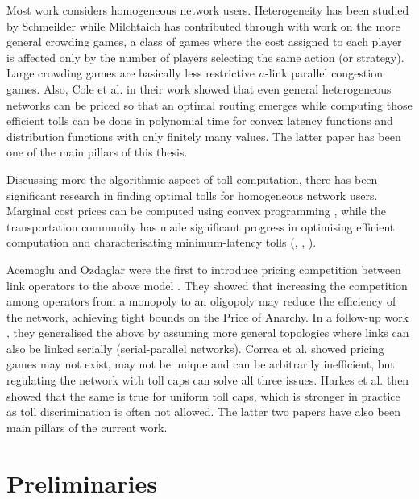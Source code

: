 \documentclass[10pt,a4paper]{book}
\theoremstyle{definition}
\theoremstyle{comment}
\begin{document}
Most work considers homogeneous network users.
Heterogeneity has been studied by Schmeilder \cite{1973JSP.....7..295S} while Milchtaich \cite[Prop $3.3$]{doi:10.1287/moor.25.3.349.12220} has contributed through with work on the more general crowding games, a class of games where the cost assigned to each player is affected only by the number of players selecting the same action (or strategy).
Large crowding games are basically less restrictive $n$-link parallel congestion games.
Also, Cole et al. \cite{10.1145/780542.780618} in their work showed that even general heterogeneous networks can be priced so that an optimal routing emerges while computing those efficient tolls can be done in polynomial time for convex latency functions and distribution functions with only finitely many values.
The latter paper has been one of the main pillars of this thesis.

Discussing more the algorithmic aspect of toll computation, there has been significant research in finding optimal tolls for homogeneous network users.
Marginal cost prices can be computed using convex programming \cite{beckmann1956studies}, while the transportation community has made significant progress in optimising efficient computation and characterisating minimum-latency tolls (\cite{10.1007/978-3-642-59179-2_4}, \cite{Hearn1998}, \cite{Hearn2002}).

Acemoglu and Ozdaglar were the first to introduce pricing competition between link operators to the above model \cite{10.1287/moor.1060.0231}.
They showed that increasing the competition among operators from a monopoly to an oligopoly may reduce the efficiency of the network, achieving tight bounds on the Price of Anarchy.
In a follow-up work \cite{10.1109/JSAC.2007.070812}, they generalised the above by assuming more general topologies where links can also be linked serially (serial-parallel networks).
Correa et al. \cite{correa2018pricing} showed pricing games may not exist, may not be unique and can be arbitrarily inefficient, but regulating the network with toll caps can solve all three issues.
Harkes et al. \cite{Harks_2019} then showed that the same is true for uniform toll caps, which is stronger in practice as toll discrimination is often not allowed.
The latter two papers have also been main pillars of the current work.


\cleardoublepage


\chapter{Preliminaries}
\label{chapter:preliminaries}
\end{document}
